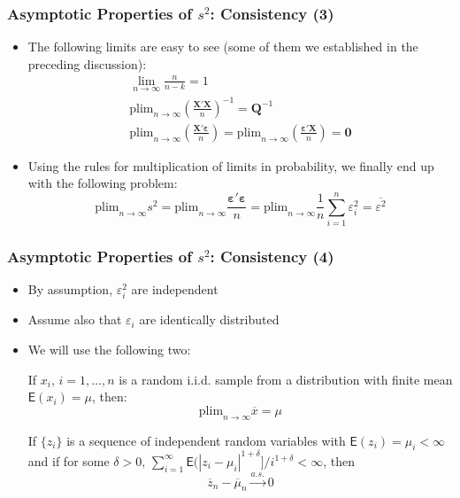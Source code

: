 \documentclass[10pt]{beamer}
\newcommand{\plim}{\mathrm{plim}}
\theoremstyle{definition}
\begin{document}
\begin{frame}[fragile]
\frametitle{Asymptotic Properties of $s^{2}$: Consistency (3)}
\begin{itemize}
	\item The following limits are easy to see (some of them we established in the preceding discussion):
	\[
		\begin{array}{lcl}
			\lim_{n\to\infty}\displaystyle\frac{n}{n-k} = 1\\
			\plim_{n\to\infty}\displaystyle \left(\frac{\mathbf{X'X}}{n}\right)^{-1} = \mathbf{Q}^{-1}\\
			\plim_{n\to\infty}\displaystyle \left(\frac{\mathbf{X'}\bm\varepsilon}{n}\right) = \plim_{n\to\infty}\displaystyle \left(\frac{\bm\varepsilon'\mathbf{X}}{n}\right) = \mathbf{0}
		\end{array}
	\]
	\item Using the rules for multiplication of limits in probability, we finally end up with the following problem:
	\[
		\plim_{n\to\infty}s^{2} = \plim_{n\to\infty} \frac{\bm\varepsilon'\bm\varepsilon}{n} = \plim_{n\to\infty}\frac{1}{n}\sum_{i=1}^{n}\varepsilon_{i}^{2} = \overline{\varepsilon^{2}}
	\]
\end{itemize}
\end{frame}

\begin{frame}[fragile]
\frametitle{Asymptotic Properties of $s^{2}$: Consistency (4)}
\begin{itemize}
	\item By assumption, $\varepsilon_{i}^{2}$ are independent
	\item Assume also that $\varepsilon_{i}$ are identically distributed
	\item We will use the following two:
	\begin{theorem}
		If $x_{i},\, i = 1,\ldots, n$ is a random i.i.d. sample from a distribution with finite mean $\mathsf{E}(x_{i}) = \mu$, then:
		\[
			\plim_{n\to\infty}\overline{x} = \mu
		\]
	\end{theorem}
	\begin{theorem}
		If $\{z_{i}\}$ is a sequence of independent random variables with $\mathsf{E}(z_{i}) = \mu_{i} < \infty$ and if for some $\delta > 0,\,\sum_{i=1}^{\infty} \mathsf{E}(|z_{i} - \mu_i|^{1+\delta}]/i^{1+\delta} < \infty$, then
		\[
			\overline{z}_n - \overline{\mu}_n \overset{a.s.}{\to} 0
		\]
	\end{theorem}
\end{itemize}
\end{frame}
\end{document}
